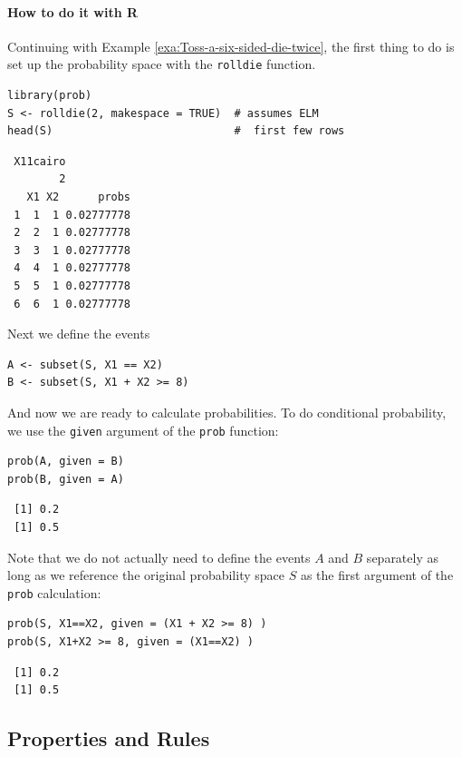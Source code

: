 \documentclass[captions=tableheading]{scrbook}
\begin{document}
\paragraph*{How to do it with \textsf{R}}

Continuing with Example \ref{exa:Toss-a-six-sided-die-twice}, the first thing to do is set up the probability space with the \texttt{rolldie} function.


\begin{verbatim}
library(prob)
S <- rolldie(2, makespace = TRUE)  # assumes ELM
head(S)                            #  first few rows
\end{verbatim}

\begin{verbatim}
 X11cairo 
        2
   X1 X2      probs
 1  1  1 0.02777778
 2  2  1 0.02777778
 3  3  1 0.02777778
 4  4  1 0.02777778
 5  5  1 0.02777778
 6  6  1 0.02777778
\end{verbatim}

Next we define the events


\begin{verbatim}
A <- subset(S, X1 == X2)
B <- subset(S, X1 + X2 >= 8)
\end{verbatim}

And now we are ready to calculate probabilities. To do conditional probability, we use the \texttt{given} argument of the \texttt{prob} function:


\begin{verbatim}
prob(A, given = B)
prob(B, given = A)
\end{verbatim}

\begin{verbatim}
 [1] 0.2
 [1] 0.5
\end{verbatim}

Note that we do not actually need to define the events \(A\) and \(B\) separately as long as we reference the original probability space \(S\) as the first argument of the \texttt{prob} calculation:


\begin{verbatim}
prob(S, X1==X2, given = (X1 + X2 >= 8) )
prob(S, X1+X2 >= 8, given = (X1==X2) )
\end{verbatim}

\begin{verbatim}
 [1] 0.2
 [1] 0.5
\end{verbatim}
\subsection{Properties and Rules}
\label{sec-4-6-1}
\end{document}
